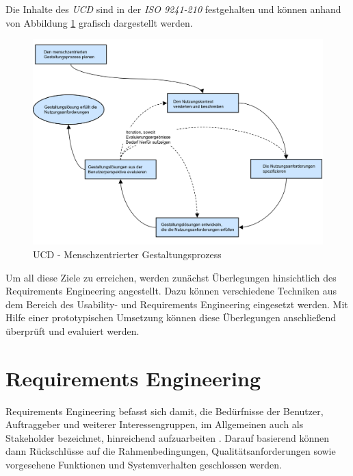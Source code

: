 Die Inhalte des \textit{\acl{UCD}} sind in der \textit{ISO 9241-210} festgehalten und können anhand von Abbildung \ref{fig:user-centered-design} grafisch dargestellt werden.
\newline

\begin{figure}[htb]
    \centering
    \includegraphics[width=1.0\textwidth]{bilder/user-centered-design.png}
    \caption{\acl{UCD} - Menschzentrierter Gestaltungsprozess \cite{geis_neue_2010}}
    \label{fig:user-centered-design}
\end{figure}

Um all diese Ziele zu erreichen, werden zunächst Überlegungen hinsichtlich des Requirements Engineering angestellt. Dazu können verschiedene Techniken aus dem Bereich des Usability- und Requirements Engineering eingesetzt werden. Mit Hilfe einer prototypischen Umsetzung können diese Überlegungen anschließend überprüft und evaluiert werden.

\section{Requirements Engineering}
\label{sec:requirements-engineering}

Requirements Engineering befasst sich damit, die Bedürfnisse der Benutzer, Auftraggeber
und weiterer Interessengruppen, im Allgemeinen auch als Stakeholder bezeichnet, hinreichend aufzuarbeiten \cite[S. 23]{richter_usability_2016}. Darauf basierend können dann Rückschlüsse auf die Rahmenbedingungen, Qualitätsanforderungen sowie vorgesehene Funktionen und Systemverhalten geschlossen werden. 


